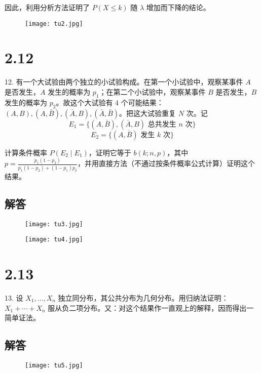 \documentclass[UTF8]{report}
\theoremstyle{MyLineTheoremStyle} %
\theoremstyle{MyBlockTheoremStyle} %
\theoremstyle{MySubsubsectionStyle} %
\begin{document}
因此，利用分析方法证明了 \(P(X \leq k)\) 随 \(\lambda\) 增加而下降的结论。

\begin{figure}[H]
    \centering
    \texttt{[image: tu2.jpg]}
\end{figure}




\section{2.12}

12. 有一个大试验由两个独立的小试验构成。在第一个小试验中，观察某事件 \(A\) 是否发生，\(A\) 发生的概率为 \(p_1\)；在第二个小试验中，观察某事件 \(B\) 是否发生，\(B\) 发生的概率为 \(p_2\)。故这个大试验有 4 个可能结果：\((A, B), (A, \bar{B}), (\bar{A}, B), (\bar{A}, \bar{B})\)。把这大试验重复 \(N\) 次。记
\[
E_1 = \{(A, \bar{B}), (\bar{A}, B) \text{ 总共发生 } n \text{ 次}\}
\]
\[
E_2 = \{(A, \bar{B}) \text{ 发生 } k \text{ 次}\}
\]

计算条件概率 \(P(E_2 \mid E_1)\)，证明它等于 \(b(k; n, p)\)，其中 \(p = \frac{p_1 (1 - p_2)}{p_1 (1 - p_2) + (1 - p_1) p_2}\)，并用直接方法（不通过按条件概率公式计算）证明这个结果。

\subsection*{解答}

\begin{figure}[H]
    \centering
    \texttt{[image: tu3.jpg]}
\end{figure}

\begin{figure}[H]
    \centering
    \texttt{[image: tu4.jpg]}
\end{figure}

\section{2.13}

13. 设 \(X_1, \ldots, X_n\) 独立同分布，其公共分布为几何分布。用归纳法证明：\(X_1 + \cdots + X_n\) 服从负二项分布。又：对这个结果作一直观上的解释，因而得出一简单证法。

\subsection*{解答}

\begin{figure}[H]
    \centering
    \texttt{[image: tu5.jpg]}
\end{figure}
\end{document}
